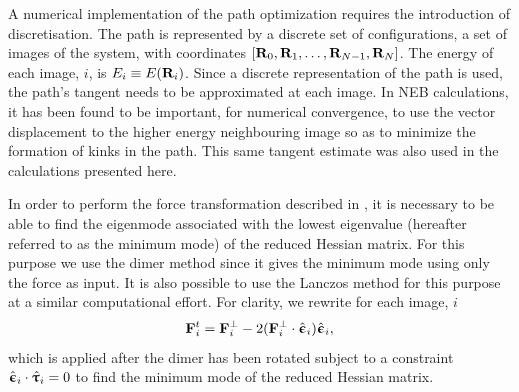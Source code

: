 A numerical implementation of the path optimization requires the introduction of discretisation.
The path is represented by a discrete set of configurations, a set of images of the system,
with coordinates $[{\mathrm{\mathbf{\bm{R}}}}_{0}, {\mathrm{\mathbf{\bm{R}}}}_{1}, \dotsc, {\mathrm{\mathbf{\bm{R}}}}_{N-1}, {\mathrm{\mathbf{\bm{R}}}}_{N}]$.
The energy of each image, $i$, is  $E_i \equiv E({\mathrm{\mathbf{\bm{R}}}}_i)$.
Since a discrete representation of the path is used, the path's tangent needs to be approximated at each image.
In NEB calculations, it has been found to be important, for numerical convergence, to use the vector displacement to the higher energy neighbouring image so as to minimize the formation of kinks in the path\cite{neb-tangent-2000}.
This same tangent estimate was also used in the calculations presented here.

In order to perform the force transformation described in , it is necessary to be able to find the eigenmode associated with the lowest eigenvalue (hereafter referred to as the minimum mode) of the reduced Hessian matrix.
For this purpose we use the dimer method\cite{dimer-original-1999, dimer-olsen-2004} since it gives the minimum mode using only the force as input.  It is also possible to use the Lanczos method for this purpose \cite{dimer-olsen-2004} at a similar computational effort.
For clarity, we rewrite  for each image, $i$
\begin{equation}
{\ensuremath{\mathrm{\mathbf{\bm{F}}}}}_i^t = {\mathrm{\mathbf{\bm{F}}}}^\perp_i - 2 ({\mathrm{\mathbf{\bm{F}}}}^\perp_i \cdot \hat{{\mathrm{\mathbf{\bm{\upepsilon}}}}}_i) \hat{{\mathrm{\mathbf{\bm{\upepsilon}}}}}_i,
\label{eq:minmode-force}
\end{equation}
which is applied after the dimer has been rotated subject to a constraint $\hat{{\mathrm{\mathbf{\bm{\upepsilon}}}}}_i \cdot \hat{{\mathrm{\mathbf{\bm{\uptau}}}}}_i =0$ to find the minimum mode of the reduced Hessian matrix.

